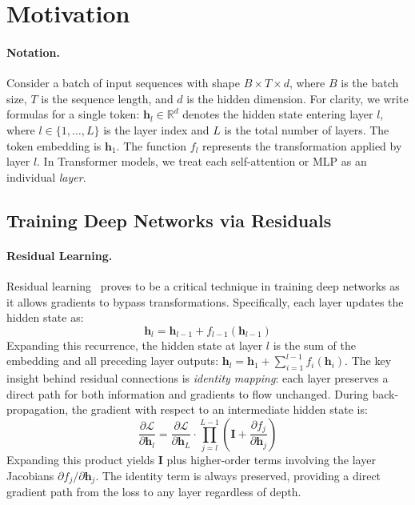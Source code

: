 










\section{Motivation}

\paragraph{Notation.} Consider a batch of input sequences with shape $B \times T \times d$, where $B$ is the batch size, $T$ is the sequence length, and $d$ is the hidden dimension. For clarity, we write formulas for a single token: $\bm{h}_l \in \mathbb{R}^{d}$ denotes the hidden state entering layer $l$, where $l \in \{1, \ldots, L\}$ is the layer index and $L$ is the total number of layers. The token embedding is $\bm{h}_1$. The function $f_l$ represents the transformation applied by layer $l$. In Transformer models, we treat each self-attention or MLP as an individual \emph{layer}.

\subsection{Training Deep Networks via Residuals}

\paragraph{Residual Learning.} 
Residual learning~\citep{he2015resnet} proves to be a critical technique in training deep networks as it allows gradients to bypass transformations.
Specifically, each layer updates the hidden state as:
$$\bm{h}_{l} = \bm{h}_{l-1} + f_{l-1}(\bm{h}_{l-1})$$
Expanding this recurrence, the hidden state at layer $l$ is the sum of the embedding and all preceding layer outputs: $\bm{h}_l = \bm{h}_1 + \sum_{i=1}^{l-1} f_i(\bm{h}_i)$.
The key insight behind residual connections is \emph{identity mapping}: each layer preserves a direct path for both information and gradients to flow unchanged. During back-propagation, the gradient with respect to an intermediate hidden state is:
$$\frac{\partial \mathcal{L}}{\partial \bm{h}_l} = \frac{\partial \mathcal{L}}{\partial \bm{h}_{L}} \cdot \prod_{j=l}^{L-1} \left( \mathbf{I} + \frac{\partial f_j}{\partial \bm{h}_j} \right)$$
Expanding this product yields $\mathbf{I}$ plus higher-order terms involving the layer Jacobians $\partial f_j/\partial \bm{h}_j$. The identity term is always preserved, providing a direct gradient path from the loss to any layer regardless of depth.

